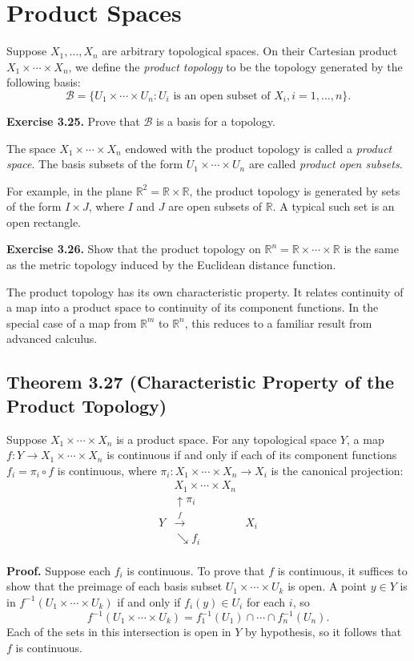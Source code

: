 \documentclass{article}
\begin{document}
\section*{Product Spaces}

Suppose \(X_1, \ldots, X_n\) are arbitrary topological spaces. On their Cartesian product \(X_1 \times \cdots \times X_n\), we define the \emph{product topology} to be the topology generated by the following basis:
\[
\mathcal{B} = \{U_1 \times \cdots \times U_n : U_i \text{ is an open subset of } X_i, i = 1, \ldots, n\}.
\]

\textbf{Exercise 3.25.} Prove that \(\mathcal{B}\) is a basis for a topology.

The space \(X_1 \times \cdots \times X_n\) endowed with the product topology is called a \emph{product space}. The basis subsets of the form \(U_1 \times \cdots \times U_n\) are called \emph{product open subsets}.

For example, in the plane \(\mathbb{R}^2 = \mathbb{R} \times \mathbb{R}\), the product topology is generated by sets of the form \(I \times J\), where \(I\) and \(J\) are open subsets of \(\mathbb{R}\). A typical such set is an open rectangle.

\textbf{Exercise 3.26.} Show that the product topology on \(\mathbb{R}^n = \mathbb{R} \times \cdots \times \mathbb{R}\) is the same as the metric topology induced by the Euclidean distance function.

The product topology has its own characteristic property. It relates continuity of a map into a product space to continuity of its component functions. In the special case of a map from \(\mathbb{R}^m\) to \(\mathbb{R}^n\), this reduces to a familiar result from advanced calculus.

\subsection*{Theorem 3.27 (Characteristic Property of the Product Topology)}
Suppose \(X_1 \times \cdots \times X_n\) is a product space. For any topological space \(Y\), a map \(f : Y \to X_1 \times \cdots \times X_n\) is continuous if and only if each of its component functions \(f_i = \pi_i \circ f\) is continuous, where \(\pi_i : X_1 \times \cdots \times X_n \to X_i\) is the canonical projection:
\[
\begin{array}{ccc}
 & X_1 \times \cdots \times X_n & \\
 & \uparrow \pi_i & \\
Y & \xrightarrow{f} & X_i \\
 & \searrow f_i & \\
\end{array}
\]

\noindent
\textbf{Proof.} Suppose each \(f_i\) is continuous. To prove that \(f\) is continuous, it suffices to show that the preimage of each basis subset \(U_1 \times \cdots \times U_k\) is open. A point \(y \in Y\) is in \(f^{-1}(U_1 \times \cdots \times U_k)\) if and only if \(f_i(y) \in U_i\) for each \(i\), so
\[
f^{-1}(U_1 \times \cdots \times U_k) = f_1^{-1}(U_1) \cap \cdots \cap f_n^{-1}(U_n).
\]
Each of the sets in this intersection is open in \(Y\) by hypothesis, so it follows that \(f\) is continuous.
\end{document}
